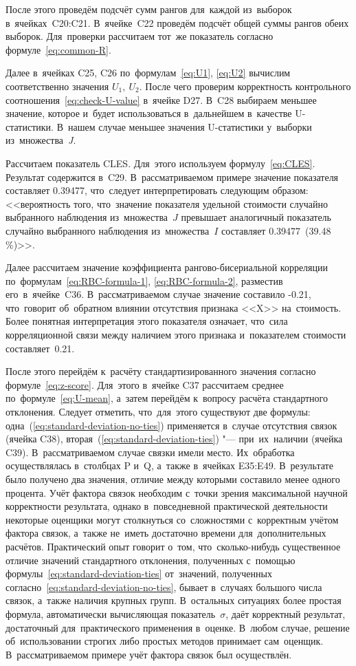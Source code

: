 \documentclass[]{scrartcl}
\begin{document}
После этого проведём подсчёт сумм рангов для~каждой из~выборок в~ячейках~C20:C21. В~ячейке~C22 проведём подсчёт общей суммы рангов обеих выборок. Для~проверки рассчитаем тот~же показатель согласно формуле~\ref{eq:common-R}.

Далее в~ячейках C25, C26 по~формулам~\ref{eq:U1}, \ref{eq:U2} вычислим соответственно значения ${\textstyle U_1,\ U_{2}}$. После чего проверим корректность контрольного соотношения~\ref{eq:check-U-value} в~ячейке D27. В~C28 выбираем меньшее значение, которое и~будет использоваться в~дальнейшем в~качестве U-статистики. В~нашем случае меньшее значения U-статистики у~выборки из~множества~\textit{J}.

Рассчитаем показатель CLES. Для~этого используем формулу~\ref{eq:CLES}. Результат содержится в~C29. В~рассматриваемом примере значение показателя составляет 0.39477, что~следует интерпретировать следующим образом: <<вероятность того, что~значение показателя удельной стоимости случайно выбранного наблюдения из~множества~$J$ превышает аналогичный показатель случайно выбранного наблюдения из~множества~$I$ составляет 0.39477~(39.48\,\%)>>.

Далее рассчитаем значение коэффициента рангово-бисериальной корреляции по~формулам~\ref{eq:RBC-formula-1}, \ref{eq:RBC-formula-2}, разместив его~в~ячейке~C36. В~рассматриваемом случае значение составило -0.21, что~говорит об~обратном влиянии отсутствия признака <<X>> на~стоимость. Более понятная интерпретация этого показателя означает, что~сила корреляционной связи между наличием этого признака и~показателем стоимости составляет~0.21.

После этого перейдём к~расчёту стандартизированного значения согласно формуле~\ref{eq:z-score}. Для~этого в~ячейке C37 рассчитаем среднее по~формуле~\ref{eq:U-mean}, а~затем перейдём к~вопросу расчёта стандартного отклонения. Следует отметить, что~для~этого существуют две формулы: одна~(\ref{eq:standard-deviation-no-ties}) применяется в~случае отсутствия связок (ячейка C38), вторая~(\ref{eq:standard-deviation-ties}) "--- при~их~наличии (ячейка C39). В~рассматриваемом случае связки имели место. Их~обработка осуществлялась в~столбцах P и~Q, а~также в~ячейках E35:E49. В~результате было получено два значения, отличие между которыми составило менее одного процента. Учёт фактора связок необходим с~точки зрения максимальной научной корректности результата, однако в~повседневной практической деятельности некоторые оценщики могут столкнуться со~сложностями с~корректным учётом фактора связок, а~также не~иметь достаточно времени для~дополнительных расчётов. Практический опыт говорит о~том, что~сколько-нибудь существенное отличие значений стандартного отклонения, полученных с~помощью формулы~\ref{eq:standard-deviation-ties} от~значений, полученных согласно~\ref{eq:standard-deviation-no-ties}, бывает в~случаях большого числа связок, а~также наличия крупных групп. В~остальных ситуациях более простая формула, автоматически вычисляющая показатель~${\textstyle \sigma}$, даёт корректный результат, достаточный для~практического применения в~оценке. В~любом случае, решение об~использовании строгих либо простых методов принимает сам~оценщик. В~рассматриваемом примере учёт фактора связок был осуществлён. 
\end{document}
